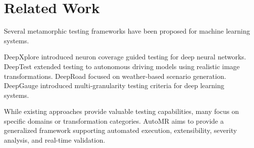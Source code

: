 \section{Related Work}

Several metamorphic testing frameworks have been proposed for machine learning systems.

DeepXplore introduced neuron coverage guided testing for deep neural networks. DeepTest extended testing to autonomous driving models using realistic image transformations. DeepRoad focused on weather-based scenario generation. DeepGauge introduced multi-granularity testing criteria for deep learning systems.

While existing approaches provide valuable testing capabilities, many focus on specific domains or transformation categories. AutoMR aims to provide a generalized framework supporting automated execution, extensibility, severity analysis, and real-time validation.